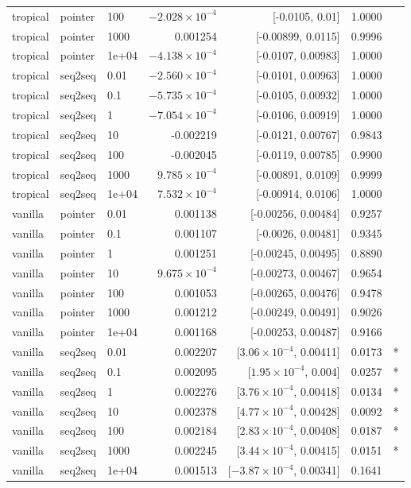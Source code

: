 \documentclass[10pt]{article}
\begin{document}
{\begin{longtable}{lllrrrl}
tropical & pointer & 100 & $-2.028\times10^{-4}$ & [-0.0105, 0.01] & 1.0000 & \\
tropical & pointer & 1000 & 0.001254 & [-0.00899, 0.0115] & 0.9996 & \\
tropical & pointer & 1e+04 & $-4.138\times10^{-4}$ & [-0.0107, 0.00983] & 1.0000 & \\
tropical & seq2seq & 0.01 & $-2.560\times10^{-4}$ & [-0.0101, 0.00963] & 1.0000 & \\
tropical & seq2seq & 0.1 & $-5.735\times10^{-4}$ & [-0.0105, 0.00932] & 1.0000 & \\
tropical & seq2seq & 1 & $-7.054\times10^{-4}$ & [-0.0106, 0.00919] & 1.0000 & \\
tropical & seq2seq & 10 & -0.002219 & [-0.0121, 0.00767] & 0.9843 & \\
tropical & seq2seq & 100 & -0.002045 & [-0.0119, 0.00785] & 0.9900 & \\
tropical & seq2seq & 1000 & $9.785\times10^{-4}$ & [-0.00891, 0.0109] & 0.9999 & \\
tropical & seq2seq & 1e+04 & $7.532\times10^{-4}$ & [-0.00914, 0.0106] & 1.0000 & \\
vanilla & pointer & 0.01 & 0.001138 & [-0.00256, 0.00484] & 0.9257 & \\
vanilla & pointer & 0.1 & 0.001107 & [-0.0026, 0.00481] & 0.9345 & \\
vanilla & pointer & 1 & 0.001251 & [-0.00245, 0.00495] & 0.8890 & \\
vanilla & pointer & 10 & $9.675\times10^{-4}$ & [-0.00273, 0.00467] & 0.9654 & \\
vanilla & pointer & 100 & 0.001053 & [-0.00265, 0.00476] & 0.9478 & \\
vanilla & pointer & 1000 & 0.001212 & [-0.00249, 0.00491] & 0.9026 & \\
vanilla & pointer & 1e+04 & 0.001168 & [-0.00253, 0.00487] & 0.9166 & \\
vanilla & seq2seq & 0.01 & 0.002207 & [$3.06\times10^{-4}$, 0.00411] & 0.0173 & *\\
vanilla & seq2seq & 0.1 & 0.002095 & [$1.95\times10^{-4}$, 0.004] & 0.0257 & *\\
vanilla & seq2seq & 1 & 0.002276 & [$3.76\times10^{-4}$, 0.00418] & 0.0134 & *\\
vanilla & seq2seq & 10 & 0.002378 & [$4.77\times10^{-4}$, 0.00428] & 0.0092 & *\\
vanilla & seq2seq & 100 & 0.002184 & [$2.83\times10^{-4}$, 0.00408] & 0.0187 & *\\
vanilla & seq2seq & 1000 & 0.002245 & [$3.44\times10^{-4}$, 0.00415] & 0.0151 & *\\
vanilla & seq2seq & 1e+04 & 0.001513 & [$-3.87\times10^{-4}$, 0.00341] & 0.1641 & \\
\bottomrule
\end{longtable}
}
\end{document}
